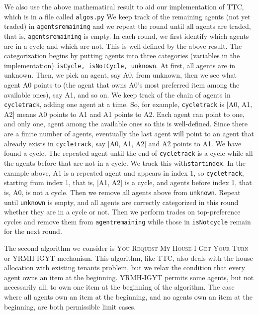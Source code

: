 \documentclass[12pt]{article}
\begin{document}
We also use the above mathematical result to aid our implementation of TTC, which is in a file called \texttt{algos.py} We keep track of the remaining agents (not yet traded) in \texttt{agents\textunderscore remaining} and we repeat the round until all agents are traded, that is, \texttt{agents\textunderscore remaining} is empty. In each round, we first identify which agents are in a cycle and which are not. This is well-defined by the above result. The categorization begins by putting agents into three categories (variables in the implementation) \texttt{isCycle, isNotCycle, unknown}. At first, all agents are in unknown. Then, we pick an agent, say A0, from unknown, then we see what agent A0 points to (the agent that owns A0's most preferred item among the available ones), say A1, and so on. We keep track of
 the chain of agents in \texttt{cycle\textunderscore track}, adding one agent at a time. So, for example, \texttt{cycle\textunderscore track} is [A0, A1, A2]
means A0 points to A1 and A1 points to A2. Each agent can point to one, and only one, agent among the available ones so this is well-defined. Since there are a finite number of agents, eventually the last agent will point to an agent that already exists in \texttt{cycle\textunderscore track}, say [A0, A1, A2] and A2 points to A1. We have found a cycle. The repeated agent until the end of \texttt{cycle\textunderscore track} is a cycle while all the agents before that are not in a cycle. We track this with\texttt{start\textunderscore index}. In the example above, A1 is  a repeated agent and appears in index 1, so \texttt{cycle\textunderscore track}, starting from index 1, that is, [A1, A2] is a cycle, and agents before index 1, that is, A0, is not a cycle. Then we remove all agents above from \texttt{unknown}. Repeat until \texttt{unknown} is empty, and all agents are correctly categorized in this round whether they are in a cycle or not. Then we perform trades on top-preference cycles and remove them from \texttt{agent\textunderscore remaining} while those in \texttt{isNotcycle} remain for the next round.

The second algorithm we consider is \textsc{You Request My House-I Get Your Turn} or \textsc{YRMH-IGYT} mechanism. This algorithm, like TTC, also deals with the house allocation with existing tenants problem, but we relax the condition that every agent owns an item at the beginning. YRMH-IGYT permits some agents, but not necessarily all, to own one item at the beginning of the algorithm. The case where all agents own an item at the beginning, and no agents own an item at the beginning, are both permissible limit cases.
\end{document}
